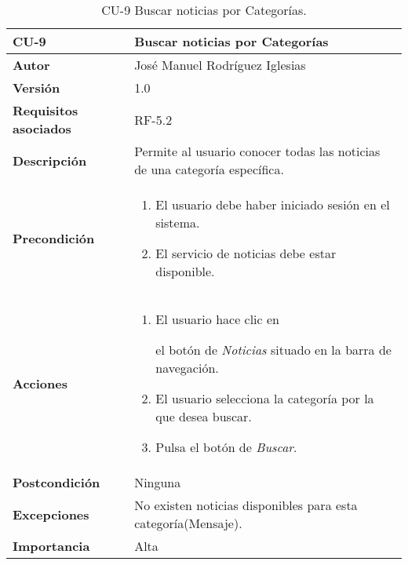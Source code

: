 \begin{table}[h]
	\centering
	\begin{tabularx}{\linewidth}{ p{} p{} }
		\toprule
		\textbf{CU-9}    & \textbf{Buscar noticias por Categorías}\\
		\toprule
            \textbf{Autor}                & José Manuel Rodríguez Iglesias \\
		\textbf{Versión}              & 1.0    \\
		\textbf{Requisitos asociados} & RF-5.2 \\
		\textbf{Descripción}          & Permite al usuario conocer todas las noticias de una categoría específica. \\
		\textbf{Precondición}         &  
            \begin{enumerate}
			\def\labelenumi{\arabic{enumi}.}
			\tightlist
			\item El usuario debe haber iniciado sesión en el sistema.
			\item El servicio de noticias debe estar disponible.
		\end{enumerate}\\
    
  
		\textbf{Acciones}             &
		\begin{enumerate}
			\def\labelenumi{\arabic{enumi}.}
			\tightlist
                \item El usuario hace clic en 
                
                el botón de\textit{ Noticias} situado en la barra de navegación.
			\item El usuario selecciona la categoría por la que desea buscar. 
                \item Pulsa el botón de \textit{Buscar}.
		\end{enumerate}\\
		\textbf{Postcondición}        & Ninguna \\
		\textbf{Excepciones}          & No existen noticias disponibles para esta categoría(Mensaje). \\
		\textbf{Importancia}          & Alta\\
		\bottomrule
	\end{tabularx}
	\caption{CU-9 Buscar noticias por Categorías.}
\end{table}

